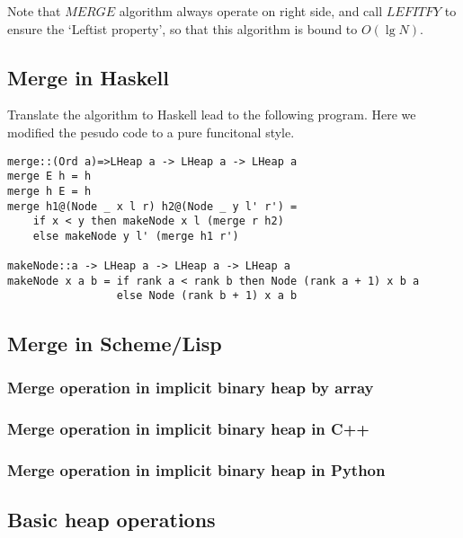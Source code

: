 \documentclass{article}
\begin{document}
Note that $MERGE$ algorithm always operate on right side, and call
$LEFITFY$ to ensure the `Leftist property', so that this algorithm
is bound to $O(\lg N)$.

\subsection*{Merge in Haskell}

Translate the algorithm to Haskell lead to the following program.
Here we modified the pesudo code to a pure funcitonal style.

\lstset{language=Haskell}
\begin{lstlisting}
merge::(Ord a)=>LHeap a -> LHeap a -> LHeap a
merge E h = h
merge h E = h
merge h1@(Node _ x l r) h2@(Node _ y l' r') = 
    if x < y then makeNode x l (merge r h2)
    else makeNode y l' (merge h1 r')

makeNode::a -> LHeap a -> LHeap a -> LHeap a
makeNode x a b = if rank a < rank b then Node (rank a + 1) x b a
                 else Node (rank b + 1) x a b
\end{lstlisting}

\subsection*{Merge in Scheme/Lisp}

\subsubsection{Merge operation in implicit binary heap by array}

\subsubsection*{Merge operation in implicit binary heap in C++}

\subsubsection*{Merge operation in implicit binary heap in Python}

\subsection{Basic heap operations}
\end{document}
